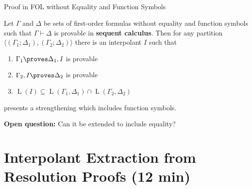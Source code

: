 \documentclass[final,compress]{beamer}
\DeclareMathOperator{\Lang}{L}
\begin{document}
\subsection{}
\begin{frame}{Proof in FOL without Equality and Function Symbols}


	\begin{lemma}[Maehara]
		Let $\Gamma$ and $\Delta$ be sets of first-order formulas without equality and function symbols   such that $\Gamma \vdash \Delta$ is provable in \textbf{sequent calculus}.
		Then for any partition $\langle(\Gamma_1;\Delta_1),(\Gamma_2;\Delta_2)\rangle$
		there is an interpolant $I$ such that
		\begin{enumerate}
			\item $\Gamma_1 \proves \Delta_1, I$ is provable
			\item $\Gamma_2, I \proves \Delta_2$ is provable
			\item $\Lang(I) \subseteq \Lang(\Gamma_1, \Delta_1) \cap \Lang(\Gamma_2, \Delta_2)$
		\end{enumerate}
	\end{lemma}

	\pause
	\cite{baaz2011methods} presents a strengthening which includes function symbols.

	\textbf{Open question:} Can it be extended to include equality?
\end{frame}

\section{Interpolant Extraction from Resolution Proofs (12 min)}
\end{document}
